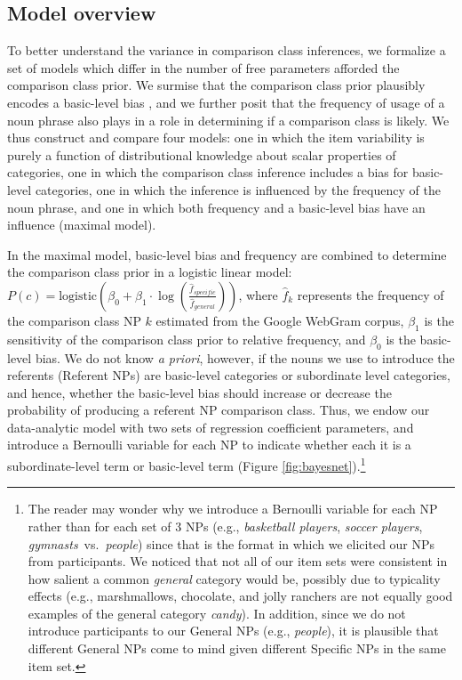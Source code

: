 \documentclass[doc]{apa6}
\begin{document}
\subsection{Model overview}

To better understand the variance in comparison class inferences, we formalize a set of models which differ in the number of free parameters afforded the comparison class prior. 
We surmise that the comparison class prior plausibly encodes a basic-level bias \cite{rosch1975family}, and we further posit that the frequency of usage of a noun phrase also plays in a role in determining if a comparison class is likely. 
We thus construct and compare four models: one in which the item variability is purely a function of distributional knowledge about scalar properties of categories, one in which the comparison class inference includes a bias for basic-level categories, one in which the inference is influenced by the frequency of the noun phrase, and one in which both frequency and a basic-level bias have an influence (maximal model). 


In the maximal model, basic-level bias and frequency are combined to  determine the comparison class prior in a logistic linear model: $P(c) = \text{logistic}(\beta_0 + \beta_1 \cdot \log (\frac{\hat{f}_{specific}}{\hat{f}_{general}}) )$, where $\hat{f}_k$  represents the frequency of the comparison class NP $k$ estimated from the Google WebGram corpus, $\beta_1$ is the sensitivity of the comparison class prior to relative frequency, and $\beta_0$ is the basic-level bias.
We do not know \emph{a priori}, however, if the nouns we use to introduce the referents (Referent NPs) are basic-level categories or subordinate level categories, and hence, whether the basic-level bias should increase or decrease the probability of producing a referent NP comparison class.
Thus, we endow our data-analytic model with two sets of regression coefficient parameters, and introduce a Bernoulli variable for each NP to indicate whether each it is a subordinate-level term or basic-level term (Figure \ref{fig:bayesnet}).\footnote{
	The reader may wonder why we introduce a Bernoulli variable for each NP rather than for each set of 3 NPs (e.g., \emph{basketball players}, \emph{soccer players}, \emph{gymnasts}~vs.~\emph{people}) since that is the format in which we elicited our NPs from participants. We noticed that not all of our item sets were consistent in how salient a common \emph{general} category would be, possibly due to typicality effects (e.g., marshmallows, chocolate, and jolly ranchers are not equally good examples of the general category \emph{candy}).  In addition, since we do not introduce participants to our General NPs (e.g., \emph{people}), it is plausible that different General NPs come to mind given different Specific NPs in the same item set. 
}
\end{document}
